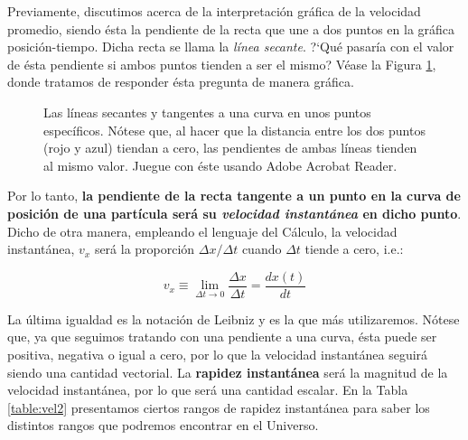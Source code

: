 Previamente, discutimos acerca de la interpretaci\'on gr\'afica de la velocidad promedio, siendo \'esta la pendiente de la recta que une a dos puntos en la gr\'afica posici\'on-tiempo. Dicha recta se llama la \emph{l\'inea secante}. ?`Qu\'e pasar\'ia con el valor de \'esta pendiente si ambos puntos tienden a ser el mismo? V\'ease la Figura \ref{fig:secantder2}, donde tratamos de responder \'esta pregunta de manera gr\'afica.

\begin{figure}[ht]
    \centering
    \caption{Las l\'ineas secantes y tangentes a una curva en unos puntos espec\'ificos. N\'otese que, al hacer que la distancia entre los dos puntos (rojo y azul) tiendan a cero, las pendientes de ambas l\'ineas tienden al mismo valor. Juegue con \'este usando Adobe Acrobat Reader.}
    \label{fig:secantder2}
\end{figure}

Por lo tanto, \textbf{la pendiente de la recta tangente a un punto en la curva de posici\'on de una part\'icula ser\'a su \emph{velocidad instant\'anea} en dicho punto}. Dicho de otra manera, empleando el lenguaje del C\'alculo, la velocidad instant\'anea, $v_{x}$ ser\'a la proporci\'on $\Delta x/\Delta t$ cuando $\Delta t$ tiende a cero, i.e.:

\begin{equation}\label{eq:deriv2}
    v_{x}\equiv \lim_{\Delta t\to0} \frac{\Delta x}{\Delta t}=\frac{dx(t)}{dt}
\end{equation}

La \'ultima igualdad es la notaci\'on de Leibniz y es la que m\'as utilizaremos. N\'otese que, ya que seguimos tratando con una pendiente a una curva, \'esta puede ser positiva, negativa o igual a cero, por lo que la velocidad instant\'anea seguir\'a siendo una cantidad vectorial. La \textbf{rapidez instant\'anea} ser\'a la magnitud de la velocidad instant\'anea, por lo que ser\'a una cantidad escalar. En la Tabla \ref{table:vel2} presentamos ciertos rangos de rapidez instant\'anea para saber los distintos rangos que podremos encontrar en el Universo.

